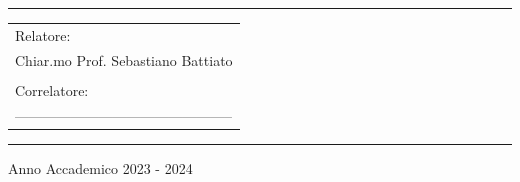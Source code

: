 \begin{titlepage}
\begin{minipage}[b]{8 cm}
\hrule
\end{minipage} %

\bigskip

\bigskip

\bigskip

\bigskip

\bigskip

\bigskip

\bigskip

\bigskip

\bigskip

\bigskip

\bigskip %

\vspace*{\fill}

\begin{flushright}
    \begin{tabular}{@{}l}
    Relatore: \\
    Chiar.mo Prof. Sebastiano Battiato \\
    \\
    Correlatore: \\
    -----------------------------------------------
    \end{tabular}
\end{flushright}

\bigskip

\bigskip

\bigskip

\bigskip %

\hrule

\bigskip

{\centering
Anno Accademico 2023 - 2024
\par}
\end{titlepage}
